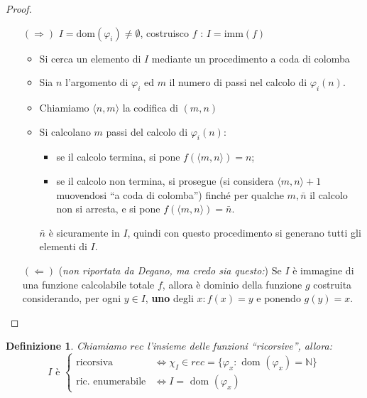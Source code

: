 \documentclass[a4paper,10pt,oneside]{article}
\theoremstyle{break}
\newtheorem{deff}{Definizione}[section]
\newcommand{\naturals}{\mathbb {N}}
\begin{document}
\begin{mdframed}
 \begin{proof}
  \begin{itemize}
   \item []
   \item[$(\Rightarrow)$] $I = \text{dom}(\varphi_i) \neq \emptyset$, costruisco $f$ : $I = \text{imm}(f)$
   \begin{itemize}
    \item Si cerca un elemento di $I$ mediante un procedimento a coda di colomba
    \item Sia $n$ l'argomento di $\varphi_i$ ed $m$ il numero di passi nel calcolo di $\varphi_i(n)$.
    \item Chiamiamo $\langle n, m \rangle$ la codifica di $(m, n)$
    \item Si calcolano $m$ passi del calcolo di $\varphi_i(n)$:
    \begin{itemize}
     \item se il calcolo termina, si pone $f(\langle m, n \rangle) = n$;
     \item se il calcolo non termina, si prosegue (si considera $\langle m, n \rangle + 1$ muovendosi ``a coda di colomba'') finché per qualche $m, \bar n$ il calcolo non si arresta, e si pone $f(\langle m, n \rangle) = \bar n$.
    \end{itemize}

    $\bar n$ è sicuramente in $I$, quindi con questo procedimento si generano tutti gli elementi di $I$.
   \end{itemize}
    \item[$(\Leftarrow)$] (\emph{non riportata da Degano, ma credo sia questo:}) Se $I$ è immagine di una funzione calcolabile totale $f$, allora è dominio della funzione $g$ costruita considerando, per ogni $y \in I$, \textbf{uno} degli $x : f(x) = y$ e ponendo $g(y) = x$.
  \end{itemize}

 \end{proof}


\end{mdframed}

\newpage
\begin{deff}
  Chiamiamo $rec$ l'insieme delle funzioni ``ricorsive'', allora:
  \[I \text{ è }\begin{cases}
    \text{ricorsiva} &\iff \chi_I \in rec = \{ \varphi_x : \text{ dom } (\varphi_x) = \naturals \}\\
    \text{ric. enumerabile} &\iff I = \text{ dom } (\varphi_x)
    \end{cases}
\]
\end{deff}
\end{document}
